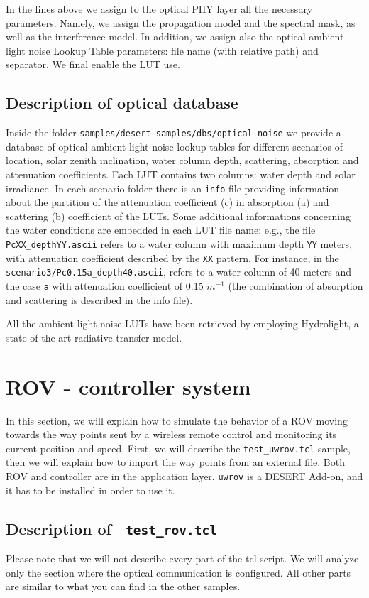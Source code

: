 \documentclass[11pt]{article}
\begin{document}
In the lines above we assign to the optical PHY layer all the necessary parameters. Namely, we assign the propagation model and the spectral mask, as well as the interference model. In addition, we assign also the optical ambient light noise Lookup Table parameters: file name (with relative path) and separator. We final enable the LUT use.

\subsection{Description of  optical database}
Inside the folder {\tt samples/desert\_samples/dbs/optical\_noise} we provide a database of optical ambient light noise lookup tables for different scenarios of location, solar zenith inclination, water column depth, scattering, absorption and attenuation coefficients. 
Each LUT contains two columns: water depth and solar irradiance.
In each scenario folder there is an {\tt info} file providing information about the partition of the attenuation coefficient (c) in absorption (a) and scattering (b) coefficient of the LUTs. Some additional informations concerning the water conditions are embedded in each LUT file name: e.g., the file {\tt PcXX\_depthYY.ascii} refers to a water column with maximum depth {\tt YY} meters, with attenuation coefficient described by the {\tt XX} pattern. For instance, in the {\tt scenario3/Pc0.15a\_depth40.ascii}, refers to a water column of 40 meters and the case {\tt a} with attenuation coefficient of 0.15 $m^{-1}$ (the combination of absorption and scattering is described in the info file).

All the ambient light noise LUTs have been retrieved by employing Hydrolight, a state of the art radiative transfer model.


\clearpage
\section{ROV - controller system}
\label{sec:uwrov}
In this section, we will explain how to simulate the behavior of a ROV moving towards the way points sent by a wireless remote control and monitoring its current position and speed. First, we will describe the {\tt test\_uwrov.tcl} sample, then we will explain how to import the way points from an external file. Both ROV and controller are in the application layer.
{\tt uwrov} is a DESERT Add-on, and it has to be installed in order to use it.
\subsection{Description of  \ {\tt test\_rov.tcl}}
Please note that we will not describe every part of the tcl script. We will analyze only the section where the optical communication is configured. All other parts are similar to what you can find in the other samples.
\end{document}
